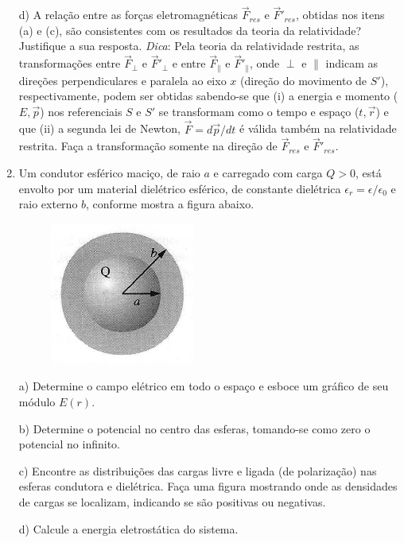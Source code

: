 \begin{enumerate}[start=1,label={\bfseries Q\arabic*.}]
\resposta

d) A relação entre as forças eletromagnéticas $\vec{F}_{res}$ e $\vec{F}'_{res}$, obtidas nos itens (a) e (c), são consistentes com os resultados da teoria da relatividade? Justifique a sua resposta. \textit{Dica}: Pela teoria da relatividade restrita, as transformações entre $\vec{F}_{\perp}$ e $\vec{F}'_{\perp}$ e entre $\vec{F}_{\parallel}$ e $\vec{F}'_{\parallel}$, onde $\perp$ e $\parallel$ indicam as direções perpendiculares e paralela ao eixo $x$ (direção do movimento de $S'$), respectivamente, podem ser obtidas sabendo-se que (i) a energia e momento ($E,\vec{p}$) nos referenciais $S$ e $S'$ se transformam como o tempo e espaço ($t,\vec{r}$) e que (ii) a segunda lei de Newton, $\vec{F} = d\vec{p}/dt$ é válida também na relatividade restrita. Faça a transformação somente na direção de $\vec{F}_{res}$ e $\vec{F}'_{res}$.




\item Um condutor esférico maciço, de raio $a$ e carregado com carga $Q > 0$, está envolto por um material dielétrico esférico, de constante dielétrica $\epsilon_{r} = \epsilon / \epsilon_{0}$ e raio externo $b$, conforme mostra a figura abaixo.
\begin{figure}[H]
\centering
\includegraphics[scale=0.8]{eletromag-img/esfera2.png}
\end{figure}
a) Determine o campo elétrico em todo o espaço e esboce um gráfico de seu módulo $E(r)$.

\resposta

b) Determine o potencial no centro das esferas, tomando-se como zero o potencial no infinito.

\resposta

c) Encontre as distribuições das cargas livre e ligada (de polarização) nas esferas condutora e dielétrica. Faça uma figura mostrando onde as densidades de cargas se localizam, indicando se são positivas ou negativas.

\resposta

d) Calcule a energia eletrostática do sistema.


\end{enumerate}
